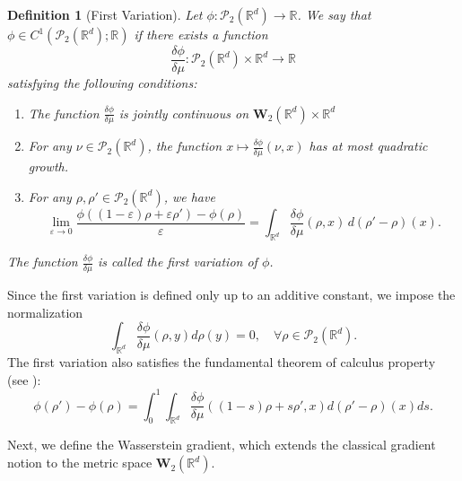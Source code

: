 \documentclass[11pt,a4paper]{amsart}
\newcommand{\1}{\mathds{1}}
\newcommand{\R}{{\mathbb R}}
\newtheorem{definition}[theorem]{\textbf{Definition}}
\numberwithin{equation}{section}
\begin{document}
\begin{definition}[First Variation] 
Let $\phi : \mathcal{P}_2(\mathbb{R}^d) \to \mathbb{R}$. We say that $\phi \in C^1(\mathcal{P}_2(\mathbb{R}^d); \mathbb{R})$ if there exists a function 
\[
\frac{\delta \phi}{\delta \mu} : \mathcal{P}_2(\mathbb{R}^d) \times \mathbb{R}^d \to \mathbb{R}
\]
satisfying the following conditions:
\begin{enumerate}
    \item  The function $\frac{\delta \phi}{\delta \mu}$ is jointly continuous on $\mathbf{W}_2(\R^d) \times \mathbb{R}^d$
    \item For any $\nu \in \mathcal{P}_2(\mathbb{R}^d)$, the function $x \mapsto \frac{\delta \phi}{\delta \mu}(\nu,x)$ has at most quadratic growth.
    \item  For any $\rho, \rho' \in \mathcal{P}_2(\mathbb{R}^d)$, we have
    \begin{equation} \label{eq:first_variation}
        \lim_{\varepsilon \to 0} \frac{\phi((1-\varepsilon) \rho + \varepsilon \rho') - \phi(\rho)}{\varepsilon} = \int_{\mathbb{R}^d} \frac{\delta \phi}{\delta \mu}(\rho,x) \, d(\rho' - \rho)(x).
    \end{equation}
\end{enumerate}

\noindent The function $\frac{\delta \phi}{\delta \mu}$ is called the \textit{first variation} of $\phi$.
\end{definition}



\noindent Since the first variation is defined only up to an additive constant, we impose the normalization
\[
\int_{\R^d} \frac{\delta \phi}{\delta \mu}(\rho,y) d\rho(y) = 0, \quad \forall \rho \in \mathcal{P}_2(\R^d).
\]
\noindent The first variation also satisfies the fundamental theorem of calculus property (see \cite{cardaliaguet2019master}):
\begin{equation}
    \phi(\rho') - \phi(\rho) = \int_0^1 \int_{\R^d} \frac{\delta \phi}{\delta \mu}((1-s)\rho + s \rho',x) d(\rho'-\rho)(x)ds.
    \label{first_variation}
\end{equation}

\smallskip

Next, we define the Wasserstein gradient, which extends the classical gradient notion to the metric space $\mathbf{W}_2(\R^d)$.

\smallskip
\end{document}

